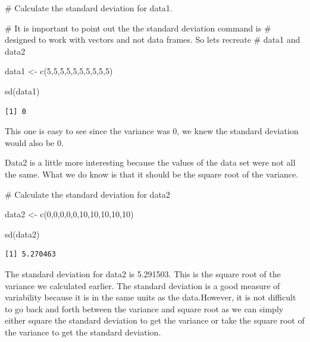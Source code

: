 \documentclass[
  letterpaper,
  DIV=11,
  numbers=noendperiod]{scrreprt}
\newenvironment{Shaded}{\begin{snugshade}}{\end{snugshade}}
\newcommand{\CommentTok}[1]{\textcolor[rgb]{0.37,0.37,0.37}{#1}}
\newcommand{\DecValTok}[1]{\textcolor[rgb]{0.68,0.00,0.00}{#1}}
\newcommand{\FunctionTok}[1]{\textcolor[rgb]{0.28,0.35,0.67}{#1}}
\newcommand{\NormalTok}[1]{\textcolor[rgb]{0.00,0.23,0.31}{#1}}
\newcommand{\OtherTok}[1]{\textcolor[rgb]{0.00,0.23,0.31}{#1}}
\begin{document}
\begin{Shaded}
\begin{Highlighting}[]
\CommentTok{\# Calculate the standard deviation for data1. }

\CommentTok{\# It is important to point out the the standard deviation command is}
\CommentTok{\# designed to work with vectors and not data frames. So let\textquotesingle{}s recreate}
\CommentTok{\# data1 and data2}

\NormalTok{data1 }\OtherTok{\textless{}{-}} \FunctionTok{c}\NormalTok{(}\DecValTok{5}\NormalTok{,}\DecValTok{5}\NormalTok{,}\DecValTok{5}\NormalTok{,}\DecValTok{5}\NormalTok{,}\DecValTok{5}\NormalTok{,}\DecValTok{5}\NormalTok{,}\DecValTok{5}\NormalTok{,}\DecValTok{5}\NormalTok{,}\DecValTok{5}\NormalTok{,}\DecValTok{5}\NormalTok{)}

\FunctionTok{sd}\NormalTok{(data1)}
\end{Highlighting}
\end{Shaded}

\begin{verbatim}
[1] 0
\end{verbatim}

This one is easy to see since the variance was 0, we knew the standard
deviation would also be 0.

Data2 is a little more interesting because the values of the data set
were not all the same. What we do know is that it should be the square
root of the variance.

\begin{Shaded}
\begin{Highlighting}[]
\CommentTok{\# Calculate the standard deviation for data2}

\NormalTok{data2 }\OtherTok{\textless{}{-}} \FunctionTok{c}\NormalTok{(}\DecValTok{0}\NormalTok{,}\DecValTok{0}\NormalTok{,}\DecValTok{0}\NormalTok{,}\DecValTok{0}\NormalTok{,}\DecValTok{0}\NormalTok{,}\DecValTok{10}\NormalTok{,}\DecValTok{10}\NormalTok{,}\DecValTok{10}\NormalTok{,}\DecValTok{10}\NormalTok{,}\DecValTok{10}\NormalTok{)}

\FunctionTok{sd}\NormalTok{(data2)}
\end{Highlighting}
\end{Shaded}

\begin{verbatim}
[1] 5.270463
\end{verbatim}

The standard deviation for data2 is 5.291503. This is the square root of
the variance we calculated earlier. The standard deviation is a good
measure of variability because it is in the same units as the
data.However, it is not difficult to go back and forth between the
variance and square root as we can simply either square the standard
deviation to get the variance or take the square root of the variance to
get the standard deviation.
\end{document}
